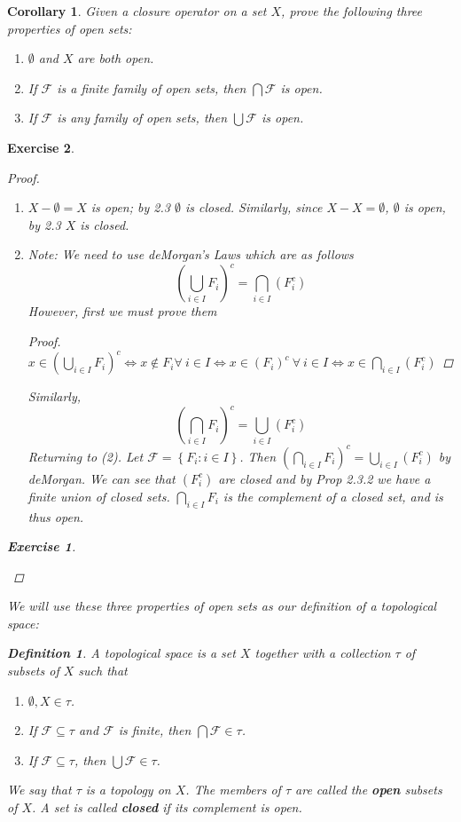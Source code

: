 \documentclass[12pt]{amsart}
\newtheorem{corollary}[theorem]{Corollary}
\newtheorem{exercise}{Exercise}[section]
\theoremstyle{definition}
\newtheorem{definition}[theorem]{Definition}
\theoremstyle{remark}
\newcommand{\0}{\emptyset}
\newcommand{\F}{\mathcal F}
\begin{document}
\begin{corollary}
Given a closure operator on a set $X$, prove the following three properties of open sets:
\begin{enumerate}
\item $\0$ and $X$ are both open.
\item If $\F$ is a finite family of open sets, then $\bigcap \F$ is open.
\item If $\F$ is any family of open sets, then $\bigcup \F$ is open.
\end{enumerate}
\end{corollary}
\begin{exercise} 
\begin{proof}
	\begin{enumerate}
		\item $X- \0 = X$ is open; by 2.3 $\0$ is closed. Similarly, since $X-X=\0$, $\0$ is open, by 2.3 $X$ is closed.
		\item Note: We need to use deMorgan's Laws which are as follows
		$$\left(\bigcup_{i \in I}F_i\right)^c = \bigcap_{i \in I}\left(F_i^c\right)$$
		However, first we must prove them
		\begin{proof}
			$x \in \left(\bigcup_{i \in I}F_i\right)^c \iff x \not\in F_i \forall\: i \in I \iff x \in \left(F_i\right)^c \:\forall\: i \in I \iff x \in \bigcap_{i \in I}\left(F_i^c\right)$
		\end{proof}
		Similarly,
		$$\left(\bigcap_{i \in I}F_i\right)^c = \bigcup_{i \in I}\left(F_i^c\right)$$
		Returning to (2). Let $\F = \left\{ F_i:i \in I \right\}$. Then $\left( \bigcap_{i \in I}F_i \right)^c = \bigcup_{i \in I}\left(F_i^c\right)$ by deMorgan. We can see that $\left( F_i^c \right)$ are closed and by Prop 2.3.2 we have a finite union of closed sets. $\bigcap_{i \in I}F_i$ is the complement of a closed set, and is thus open.
	\end{enumerate}
\begin{exercise}\end{exercise}
\end{proof}

We will use these three properties of open sets as our definition of a topological space:

\begin{definition}
A topological space is a set $X$ together with a collection $\tau$ of subsets of $X$ such that
\begin{enumerate}
\item $\0, X \in \tau$.
\item If $\F \subseteq \tau$ and $\F$ is finite, then $\bigcap \F \in \tau$.
\item If $\F \subseteq \tau$, then $\bigcup \F \in \tau$.
\end{enumerate}
We say that $\tau$ is a topology on $X$. The members of $\tau$ are called the \textbf{open} subsets of $X$. A set is called \textbf{closed} if its complement is open.
\end{definition}


\end{exercise}
\end{document}
